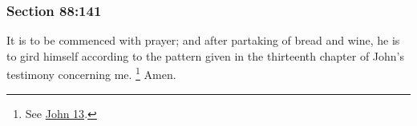 	\subsubsection{Section 88:141} %
		\label{DC88-141}

		It is to be commenced with prayer; and after partaking of bread and wine, he is to gird himself according to the pattern given in the thirteenth chapter of John's testimony concerning me.%
			\footnote{%
				See \hyperref[JOHN-13]{John 13}.
				}
		Amen.

